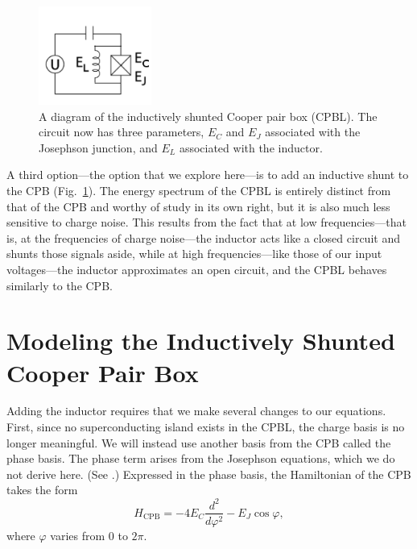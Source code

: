 \documentclass[twocolumn]{revtex4}
\newcommand{\figwidth}{0.33\textwidth}
\begin{document}
\begin{figure}
  \includegraphics[width=\figwidth]{CPBL-circuit.png}
  \caption{ A diagram of the inductively shunted Cooper pair box
    (CPBL). The circuit now has three parameters, $E_C$ and $E_J$
    associated with the Josephson junction, and $E_L$ associated with
    the inductor.}
  \label{CPBL-circuit}
\end{figure}

A third option---the option that we explore here---is to add an
inductive shunt to the CPB (Fig.~\ref{CPBL-circuit}). The energy
spectrum of the CPBL is entirely distinct from that of the CPB and
worthy of study in its own right, but it is also much less sensitive
to charge noise. This results from the fact that at low
frequencies---that is, at the frequencies of charge noise---the
inductor acts like a closed circuit and shunts those signals
aside, while at high frequencies---like those of our input
voltages---the inductor approximates an open circuit, and the CPBL
behaves similarly to the CPB.

\section{Modeling the Inductively Shunted Cooper Pair Box}

Adding the inductor requires that we make several changes to our
equations. First, since no superconducting island exists in the CPBL,
the charge basis is no longer meaningful. We will instead use another
basis from the CPB called the phase basis. The phase term arises from
the Josephson equations, which we do not derive here. (See
\cite{Feynman}.) Expressed in the phase basis, the Hamiltonian of the
CPB takes the form
\begin{equation}
  H_{\text{CPB}} = -4E_C\frac{d^2}{d\varphi^2}-E_J\cos{\varphi},
\end{equation}
where $\varphi$ varies from $0$ to $2\pi$.
\end{document}
